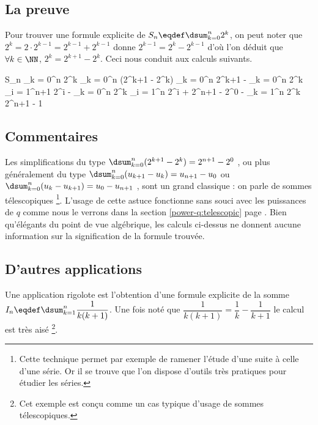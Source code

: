 \subsection{La preuve}

Pour trouver une formule explicite de $S_n \eqdef \dsum_{k = 0}^{n} 2^k$, on peut noter que
$2^k = 2 \cdot 2^{k-1} = 2^{k-1} + 2^{k-1}$
donne
$2^{k-1} = 2^k - 2^{k-1}$
d'où l'on déduit que
$\forall k \in \NN$, $2^k = 2^{k+1} - 2^k$.
Ceci nous conduit aux calculs suivants.

\medskip

\begin{explain}[style = sar]
	S_n 
		\explnext[\eqdef]{}
	\dsum_{k = 0}^{n} 2^k
		\explnext{}
	\dsum_{k = 0}^{n} (2^{k+1} - 2^k)
		\explnext{}
	\dsum_{k = 0}^{n} 2^{k+1} - \dsum_{k = 0}^{n} 2^k
	\dsum_{i = 1}^{n+1} 2^{i} - \dsum_{k = 0}^{n} 2^k
	\dsum_{i = 1}^{n} 2^{i} + 2^{n+1} - 2^0 - \dsum_{k = 1}^{n} 2^k
		\explnext{}
	2^{n+1} - 1
\end{explain}




\subsection{Commentaires}

Les simplifications du type
$\dsum_{k = 0}^{n} (2^{k+1} - 2^k) = 2^{n+1} - 2^0$ ,
ou plus généralement du type
$\dsum_{k = 0}^{n} (u_{k+1} - u_{k}) = u_{n+1} - u_0$
ou
$\dsum_{k = 0}^{n} (u_{k} - u_{k+1}) = u_0 - u_{n+1}$ ,
sont un grand classique : on parle de \og sommes télescopiques \fg{}
\footnote{
	Cette technique permet par exemple de ramener l'étude d'une suite à celle d'une série.
	Or il se trouve que l'on dispose d'outils très pratiques pour étudier les séries.
}.
L'usage de cette astuce fonctionne sans souci avec les puissances de $q$ comme nous le verrons dans la section \ref{power-q:telescopic} page \pageref{power-q:telescopic}.
Bien qu'élégants du point de vue algébrique, les calculs ci-dessus ne donnent aucune information sur la signification de la formule trouvée.




\subsection{D'autres applications}

Une application rigolote est l'obtention d'une formule explicite de la somme $I_n \eqdef \dsum_{k = 1}^{n} \dfrac{1}{k(k+1)}$. 
Une fois noté que $\dfrac{1}{k(k+1)} = \dfrac{1}{k} -  \dfrac{1}{k+1}$
le calcul est très aisé
\footnote{
	Cet exemple est conçu comme un cas typique d'usage de sommes télescopiques.
}.

